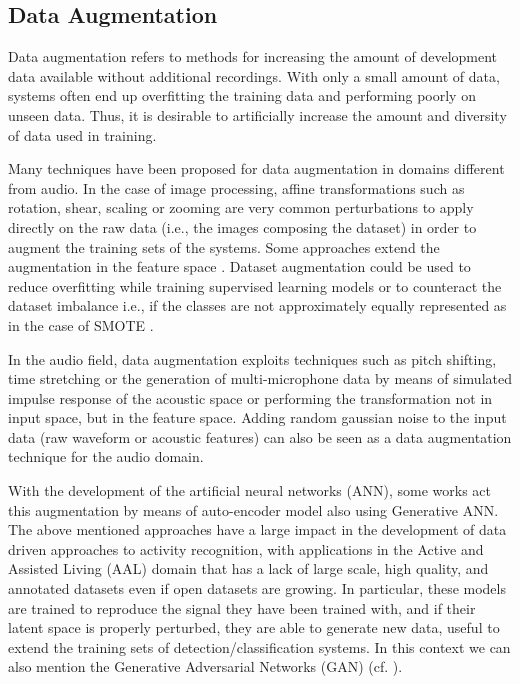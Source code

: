 \subsection{Data Augmentation}
Data augmentation refers to methods for increasing the amount of development data
available without additional recordings. With only a small amount of data, systems
often end up overfitting the training data and performing poorly on unseen data.
Thus, it is desirable to artificially increase the amount and diversity of data used in
training. 

Many techniques have been proposed for data augmentation in domains different from audio. In the case of image processing, affine transformations such as rotation, shear, scaling or zooming are very common perturbations to apply directly on the raw data (i.e., the images composing the dataset) in order to augment the training sets of the systems. Some approaches extend the augmentation in the feature space \cite{li2014learning}.
Dataset augmentation could be used to reduce overfitting while training supervised learning models or to counteract the dataset imbalance i.e., if the classes are not approximately equally represented as in the case of SMOTE \cite{chawla2002smote, han2005borderline}. 

In the audio field, data augmentation exploits techniques such as pitch shifting, time stretching or the generation of multi-microphone data by means of simulated impulse response of the acoustic space or performing the transformation not in input space, but in the feature space. Adding random gaussian noise to the input data (raw waveform or acoustic features) can also be seen as a data augmentation technique for the audio domain.

With the development of the artificial neural networks (ANN), some works act this augmentation by means of auto-encoder model also using Generative ANN. The above mentioned approaches have a large impact in the development of data driven approaches to activity recognition, with applications in the Active and Assisted Living (AAL) domain that has a lack of large scale, high quality, and annotated datasets even if open datasets are growing. In particular, these models are trained to reproduce the signal they have been trained with, and if their latent space is properly perturbed, they are able to generate new data, useful to extend the training sets of detection/classification systems. In this context we can also mention the Generative Adversarial Networks (GAN) (cf. ). 

